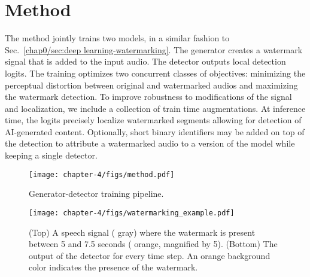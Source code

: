 

\section{Method}
\label{chap4/sec:method}
The method jointly trains two models, in a similar fashion to Sec.~\ref{chap0/sec:deep learning-watermarking}.
The generator creates a watermark signal that is added to the input audio. 
The detector outputs local detection logits.
The training optimizes two concurrent classes of objectives: minimizing the perceptual distortion between original and watermarked audios and maximizing the watermark detection. 
To improve robustness to modifications of the signal and localization, we include a collection of train time augmentations.
At inference time, the logits precisely localize watermarked segments allowing for detection of AI-generated content.
Optionally, short binary identifiers may be added on top of the detection to attribute a watermarked audio to a version of the model while keeping a single detector.


\begin{figure}[b]
    \centering
    \texttt{[image: chapter-4/figs/method.pdf]}
    \caption{Generator-detector training pipeline.}
    \label{chap4/fig:method}
\end{figure}

\begin{figure}[b!]
    \centering
    \texttt{[image: chapter-4/figs/watermarking\_example.pdf]}
    \caption{
    (Top) A speech signal ({\color{darkgray} gray}) where the watermark is present between 5 and 7.5 seconds ({\color{orange} orange}, magnified by 5).
    (Bottom) The output of the detector for every time step. 
    An {\color{orange!50} orange} background color indicates the presence of the watermark.
    }
    \label{chap4/fig:loc_quali}
\end{figure}





